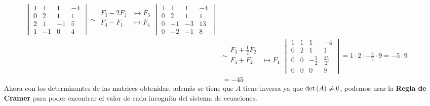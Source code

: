 \begin{enumerate}[label=\listAlph]
\[\begin{aligned}
\begin{vmatrix}
                        1 & 1 & 1 & -4 \\
                        0 & 2 & 1 & 1 \\
                        2 & 1 & -1 & 5 \\
                        1 & -1 & 0 & 4
                    \end{vmatrix}
                    \sim
                    \begin{aligned}
                        F_3 - 2F_1 &\mapsto F_3 \\
                        F_4 - F_1 &\mapsto F_4 \\
                    \end{aligned}
                    \begin{vmatrix}
                        1 & 1 & 1 & -4 \\
                        0 & 2 & 1 & 1 \\
                        0 & -1 & -3 & 13 \\
                        0 & -2 & -1 & 8
                    \end{vmatrix}
                    \\
                    &\sim
                    \begin{aligned}
                        F_3 + \frac{1}{2}F_2 \\
                        F_4 + F_2 &\mapsto F_4 \\
                    \end{aligned}
                    \begin{vmatrix}
                        1 & 1 & 1 & -4 \\
                        0 & 2 & 1 & 1 \\
                        0 & 0 & -\frac{5}{2} & \frac{25}{2} \\
                        0 & 0 & 0 & 9
                    \end{vmatrix}
                    = 1 \cdot 2 \cdot -\frac{5}{2} \cdot 9 = -5 \cdot 9
                    \\
                    &= -45
                \end{aligned}
            \]
            Ahora con los determinantes de las matrices obtenidas, además se tiene que \(A\) tiene inversa ya que \(\text{det} \left( A \right) \neq 0\), podemos usar la 
            \textbf{Regla de Cramer} para poder encontrar el valor de cada incognita del sistema de ecuaciones.
            \[
                \begin{aligned}

\end{aligned}\]
\end{enumerate}
